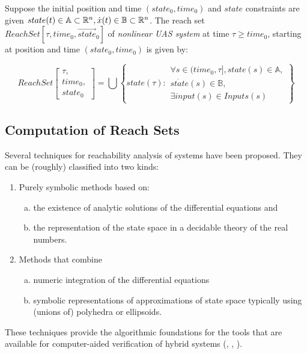     \begin{definition}
        Suppose the initial position and time $(state_0, time_0)$ and $state$ constraints are given $state(t) \in \mathbb{A} \subset \mathbb{R}^n, \dot{x}(t) \in \mathbb{B} \subset \mathbb{R}^n$. The reach set $ReachSet[\tau, time_0, \vec{state}_0]$ of \emph{nonlinear UAS system} at time $\tau \ge time_0$, starting at position and time $(state_0, time_0)$ is given by:
        
        \begin{equation}
            ReachSet\left[\begin{gathered}\tau,\\ time_0,\\ state_0\end{gathered}\right] = \bigcup 
            \left\{
                state(\tau):
                \begin{gathered}
                    \forall s\in (time_0,\tau], state(s) \in \mathbb{A},\\ 
                    \dot{state}(s) \in \mathbb{B},\\ 
                    \exists input(s) \in Inputs(s)
                \end{gathered}
            \right\}
        \end{equation}
        
    \end{definition}


    \subsection{Computation of Reach Sets}
    \noindent   Several techniques for reachability analysis of systems have been proposed. They can be (roughly) classified into two kinds:
    
    \begin{enumerate}
    \item Purely symbolic methods based on: 
        \begin{enumerate}[a.]
        \item the existence of analytic solutions of the differential equations and 
    
        \item the representation of the state space in a decidable theory of the real numbers.
        \end{enumerate}
    \item Methods that combine 
    \begin{enumerate}[a.]
        \item numeric integration of the differential equations
    
        \item symbolic representations of approximations of state space typically using (unions of) polyhedra or ellipsoids.
        \end{enumerate}
    \end{enumerate}
    These techniques provide the algorithmic foundations for the tools that are available for computer-aided verification of hybrid systems (\cite{daws1996tool}, \cite{henzinger1994symbolic}, \cite{henzinger1995hytech}).


